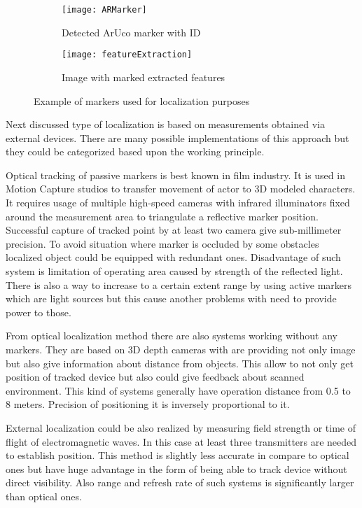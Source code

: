\documentclass[printmode,en]{mgr}
\begin{document}
\begin{figure}[!ht]
\centering
\begin{subfigure}{.5\textwidth}
  \centering
  \texttt{[image: ARMarker]}
  \caption{Detected ArUco marker with ID \cite{ArUco}}
  \label{fig:ARMarker}
\end{subfigure}%
\begin{subfigure}{.5\textwidth}
  \centering
  \texttt{[image: featureExtraction]}
  \caption{Image with marked extracted features}
  \label{fig:featureExtraction}
\end{subfigure}
\caption{Example of markers used for localization purposes}
\label{fig:markerBasedLocalization}
\end{figure}

Next discussed type of localization is based on measurements obtained via external devices. There are many possible implementations of this approach but they could be categorized based upon the working principle.

Optical tracking of passive markers \cite{MoCap} is best known in film industry. It is used in Motion Capture studios to transfer movement of actor to 3D modeled characters. It requires usage of multiple high-speed cameras with infrared illuminators fixed around the measurement area to triangulate a reflective marker position. Successful capture of tracked point by at least two camera give sub-millimeter precision. To avoid situation where marker is occluded by some obstacles localized object could be equipped with redundant ones. Disadvantage of such system is limitation of operating area caused by strength of the reflected light. There is also a way to increase to a certain extent range by using active markers which are light sources but this cause another problems with need to provide power to those.

From optical localization method there are also systems working without any markers. They are based on 3D depth cameras with are providing not only image but also give information about distance from objects. This allow to not only get position of tracked device but also could give feedback about scanned environment. This kind of systems generally have operation distance from 0.5 to 8 meters. Precision of positioning it is inversely proportional to it.

External localization could be also realized by measuring field strength or time of flight of electromagnetic waves. In this case at least three transmitters are needed to establish position. This method is slightly less accurate in compare to optical ones but have huge advantage in the form of being able to track device without direct visibility. Also range and refresh rate of such systems is significantly larger than optical ones.
\end{document}
